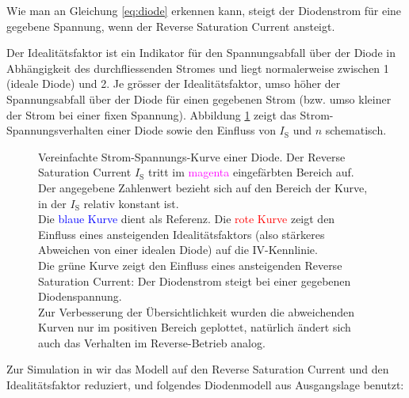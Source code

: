 Wie  man an  Gleichung \ref{eq:diode}  erkennen kann,  steigt der  Diodenstrom
f\"ur eine gegebene Spannung, wenn der Reverse Saturation Current ansteigt.

Der Idealit\"atsfaktor ist ein Indikator  f\"ur den Spannungsabfall \"uber der
Diode in  Abh\"angigkeit des durchfliessenden Stromes  und liegt normalerweise
zwischen  1  (ideale  Diode)   und  2. Je  gr\"osser  der  Idealit\"atsfaktor,
umso  h\"oher  der Spannungsabfall  \"uber  der  Diode f\"ur  einen  gegebenen
Strom  (bzw.  umso kleiner  der  Strom  bei einer  fixen  Spannung). Abbildung
\ref{fig:diodeVI:IS} zeigt das Strom-Spannungsverhalten  einer Diode sowie den
Einfluss von $I_{\mathrm{S}}$ und $n$ schematisch.

\begin{figure}[h!tb]
    
    \caption{%
        Vereinfachte Strom-Spannungs-Kurve einer Diode. Der Reverse Saturation
        Current   $I_{\mathrm{S}}$   tritt   im   \textcolor{magenta}{magenta}
        eingef\"arbten Bereich auf. Der angegebene Zahlenwert bezieht sich auf
        den  Bereich  der  Kurve,  in der  $I_{\mathrm{S}}$  relativ  konstant
        ist.\protect\\
        Die    \textcolor{blue}{blaue   Kurve}    dient   als    Referenz. Die
        \textcolor{red}{rote  Kurve}  zeigt  den Einfluss  eines  ansteigenden
        Idealit\"atsfaktors  (also  st\"arkeres  Abweichen von  einer  idealen
        Diode) auf die IV-Kennlinie.\protect\\
        Die \textcolor{green!50!black}{gr\"une Kurve} zeigt den Einfluss eines
        ansteigenden  Reverse Saturation  Current: Der Diodenstrom  steigt bei
        einer gegebenen Diodenspannung.\protect\\
        Zur  Verbesserung  der  \"Ubersichtlichkeit  wurden  die  abweichenden
        Kurven nur  im positiven Bereich geplottet,  nat\"urlich \"andert sich
        auch das Verhalten im Reverse-Betrieb analog.%
    }
    \label{fig:diodeVI:IS}
\end{figure}


Zur Simulation  in   wir das Modell  auf den  Reverse Saturation
Current und  den Idealit\"atsfaktor reduziert, und  folgendes Diodenmodell aus
Ausgangslage benutzt:

\begin{center}
\end{center}

